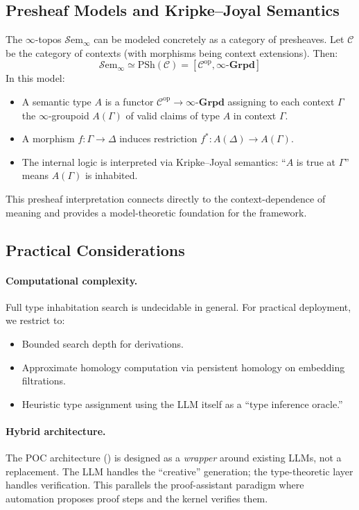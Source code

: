 \documentclass[11pt,a4paper]{article}
\theoremstyle{plain}
\theoremstyle{definition}
\theoremstyle{remark}
\newcommand{\Grpd}{\boldsymbol{\infty}\text{-}\mathbf{Grpd}}
\newcommand{\op}{\mathrm{op}}
\newcommand{\PSh}{\mathrm{PSh}}
\begin{document}
\subsection{Presheaf Models and Kripke--Joyal Semantics}

The $\infty$-topos $\mathcal{S}\mathrm{em}_\infty$ can be modeled concretely as a category of presheaves. Let $\mathcal{C}$ be the category of contexts (with morphisms being context extensions). Then:
\[
\mathcal{S}\mathrm{em}_\infty \simeq \PSh(\mathcal{C}) = [\mathcal{C}^{\op}, \Grpd]
\]
In this model:
\begin{itemize}[nosep]
  \item A semantic type $A$ is a functor $\mathcal{C}^{\op} \to \Grpd$ assigning to each context $\Gamma$ the $\infty$-groupoid $A(\Gamma)$ of valid claims of type $A$ in context $\Gamma$.
  \item A morphism $f\colon \Gamma \to \Delta$ induces restriction $f^*\colon A(\Delta) \to A(\Gamma)$.
  \item The internal logic is interpreted via Kripke--Joyal semantics: ``$A$ is true at $\Gamma$'' means $A(\Gamma)$ is inhabited.
\end{itemize}

This presheaf interpretation connects directly to the context-dependence of meaning and provides a model-theoretic foundation for the framework.

\subsection{Practical Considerations}

\paragraph{Computational complexity.} Full type inhabitation search is undecidable in general. For practical deployment, we restrict to:
\begin{itemize}[nosep]
  \item Bounded search depth for derivations.
  \item Approximate homology computation via persistent homology on embedding filtrations.
  \item Heuristic type assignment using the LLM itself as a ``type inference oracle.''
\end{itemize}

\paragraph{Hybrid architecture.} The POC architecture () is designed as a \emph{wrapper} around existing LLMs, not a replacement. The LLM handles the ``creative'' generation; the type-theoretic layer handles verification. This parallels the proof-assistant paradigm where automation proposes proof steps and the kernel verifies them.
\end{document}
